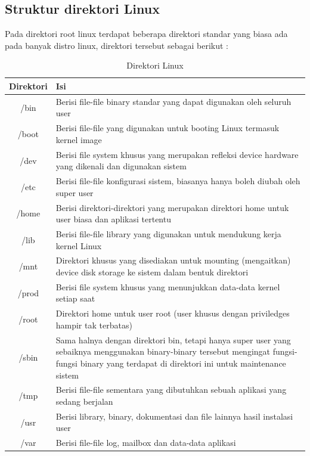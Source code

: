 \subsection{Struktur direktori Linux}
Pada direktori root linux terdapat beberapa direktori standar yang biasa ada pada banyak distro linux, direktori tersebut sebagai berikut :
\begin{table}[h]
		\caption{Direktori Linux}
		\label{direktori}
			\begin{tabular}{|c|l|}
			\hline
			\textbf{Direktori}& \textbf{Isi} \\
			\hline
			/bin&Berisi file-file binary standar yang dapat digunakan oleh seluruh user \\
			\hline
			/boot&Berisi file-file yang digunakan untuk booting Linux termasuk kernel image\\
			\hline
			/dev& Berisi file system khusus yang merupakan refleksi device hardware yang dikenali dan digunakan sistem \\
			\hline
			/etc&Berisi file-file konfigurasi sistem, biasanya hanya boleh diubah oleh super user\\
			\hline
			/home&Berisi direktori-direktori yang merupakan direktori home untuk user biasa dan aplikasi tertentu\\
			\hline
			/lib&Berisi file-file library yang digunakan untuk mendukung kerja kernel Linux\\
			\hline
			/mnt&Direktori khusus yang disediakan untuk mounting (mengaitkan) device disk storage ke sistem dalam bentuk direktori \\
			\hline
			/prod&Berisi file system khusus yang menunjukkan data-data kernel setiap saat\\
			\hline
			/root&Direktori home untuk user root (user khusus dengan priviledges hampir tak terbatas)\\
			\hline
			/sbin&Sama halnya dengan direktori bin, tetapi hanya super user yang sebaiknya menggunakan binary-binary tersebut mengingat fungsi-fungsi binary yang terdapat di direktori ini untuk maintenance sistem\\
			\hline
			/tmp&Berisi file-file sementara yang dibutuhkan sebuah aplikasi yang sedang berjalan\\
			\hline
			/usr&Berisi library, binary, dokumentasi dan file lainnya hasil instalasi user\\
			\hline
			/var&Berisi file-file log, mailbox dan data-data aplikasi\\
			\hline
		\end{tabular}
		\end{table}

